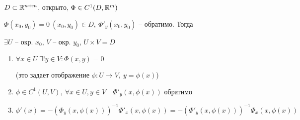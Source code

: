     \begin{theorem}
        $D \subset \mathbb{R}^{n+m}$, открыто, $\Phi \in C^1(D, \mathbb{R}^m)$
        \par $\Phi(x_0, y_0) = 0 \ (x_0, y_0) \in D, \ \Phi'_y(x_0, y_0)$ -- обратимо. Тогда
        \par $\exists U$ -- окр. $x_0$, $V$ -- окр. $y_0$, $U \times V  = D$
        \begin{enumerate}
            \item $\forall x \in U \ \exists! y \in V : \Phi(x, y) = 0$
            \par (это задает отображение $\phi : U \rightarrow V, \ y = \phi(x)$)
            \item $\phi \in C^1(U, V), \ \forall x \in U, y \in V \quad \Phi'_y(x, \phi(x))$ обратимо
            \item $\phi'(x) = -(\Phi_y(x, \phi(x)))^{-1} \Phi'_x(x, \phi(x)) = -(\Phi'_y(x, \phi(x)))^{-1} \Phi_x(x, \phi(x))$
        \end{enumerate}
    \end{theorem}

